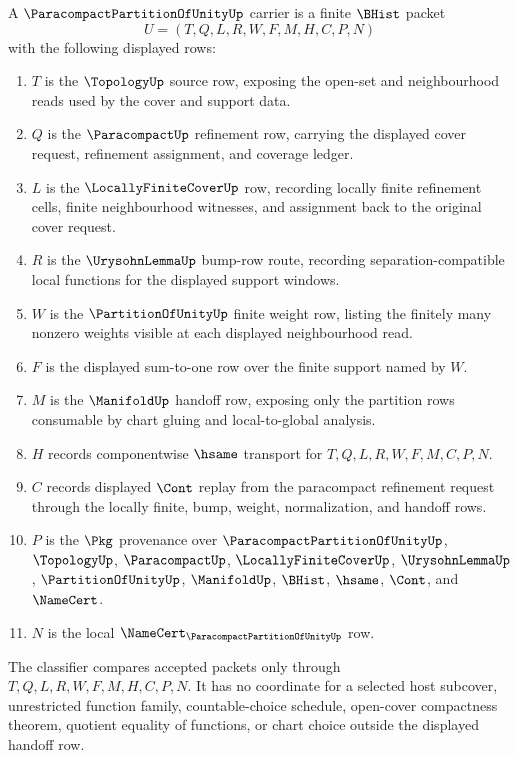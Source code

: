 \begin{definition}
\label{def:paracompact-partition-of-unity-carrier}
A $\ParacompactPartitionOfUnityUp$ carrier is a finite $\BHist$ packet
$$
U=(T,Q,L,R,W,F,M,H,C,P,N)
$$
with the following displayed rows:
\begin{enumerate}
\item $T$ is the $\TopologyUp$ source row, exposing the open-set and neighbourhood reads used by the cover and support data.
\item $Q$ is the $\ParacompactUp$ refinement row, carrying the displayed cover request, refinement assignment, and coverage ledger.
\item $L$ is the $\LocallyFiniteCoverUp$ row, recording locally finite refinement cells, finite neighbourhood witnesses, and assignment back to the original cover request.
\item $R$ is the $\UrysohnLemmaUp$ bump-row route, recording separation-compatible local functions for the displayed support windows.
\item $W$ is the $\PartitionOfUnityUp$ finite weight row, listing the finitely many nonzero weights visible at each displayed neighbourhood read.
\item $F$ is the displayed sum-to-one row over the finite support named by $W$.
\item $M$ is the $\ManifoldUp$ handoff row, exposing only the partition rows consumable by chart gluing and local-to-global analysis.
\item $H$ records componentwise $\hsame$ transport for $T,Q,L,R,W,F,M,C,P,N$.
\item $C$ records displayed $\Cont$ replay from the paracompact refinement request through the locally finite, bump, weight, normalization, and handoff rows.
\item $P$ is the $\Pkg$ provenance over $\ParacompactPartitionOfUnityUp$, $\TopologyUp$, $\ParacompactUp$, $\LocallyFiniteCoverUp$, $\UrysohnLemmaUp$, $\PartitionOfUnityUp$, $\ManifoldUp$, $\BHist$, $\hsame$, $\Cont$, and $\NameCert$.
\item $N$ is the local $\NameCert_{\ParacompactPartitionOfUnityUp}$ row.
\end{enumerate}
The classifier compares accepted packets only through $T,Q,L,R,W,F,M,H,C,P,N$. It has no coordinate for a selected host subcover, unrestricted function family, countable-choice schedule, open-cover compactness theorem, quotient equality of functions, or chart choice outside the displayed handoff row.
\end{definition}


